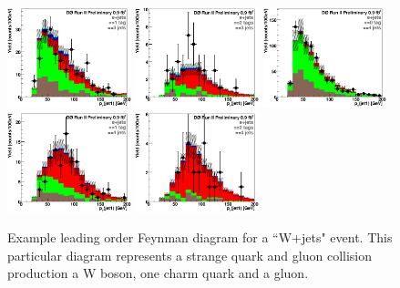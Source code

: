 \begin{figure}[!h!tbp]
\begin{center}
\includegraphics[width=0.32\textwidth]{eps/DataBackground/electron/CC_EqOneTag_EqThreeJet_Jet1Pt.eps}
\includegraphics[width=0.32\textwidth]{eps/DataBackground/electron/CC_EqTwoTag_EqThreeJet_Jet1Pt.eps}
\includegraphics[width=0.32\textwidth]{eps/DataBackground/electron/CC_EqZeroTag_EqFourJet_Jet1Pt.eps}
\includegraphics[width=0.32\textwidth]{eps/DataBackground/electron/CC_EqOneTag_EqFourJet_Jet1Pt.eps}
\includegraphics[width=0.32\textwidth]{eps/DataBackground/electron/CC_EqTwoTag_EqFourJet_Jet1Pt.eps}
\end{center}
\vspace{-0.1in}
\caption{Example leading order Feynman diagram for a ``W+jets" event. This particular diagram represents a strange quark and gluon collision production a W boson, one charm quark and a gluon.}
\label{wjets}
\end{figure}


